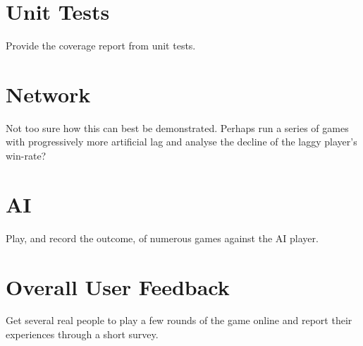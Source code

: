 \documentclass{standalone}
\begin{document}
	\section{Unit Tests}
		Provide the coverage report from unit tests.

	\section{Network}
		Not too sure how this can best be demonstrated. Perhaps run a series of games with progressively more artificial lag and analyse the decline of the  laggy player's win-rate?

	\section{AI}
		Play, and record the outcome, of numerous games against the AI player.

	\section{Overall User Feedback}
		Get several real people to play a few rounds of the game online and report their experiences through a short survey.
\end{document}
